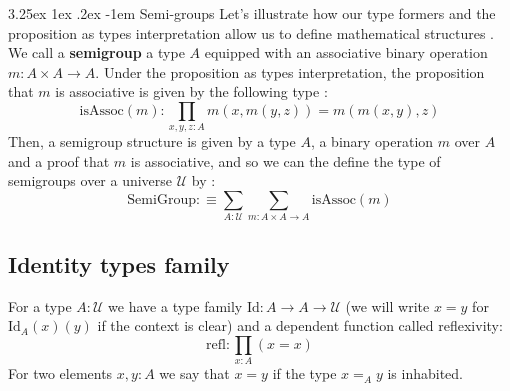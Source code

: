 \documentclass{report}
\makeatletter
\renewcommand\paragraph{\@startsection{paragraph}{5}{\z@}%
  {3.25ex \@plus1ex \@minus.2ex}%
  {-1em}%
  {\normalfont\normalsize\bfseries}}
\makeatother
\begin{document}
\paragraph{Semi-groups}
Let's illustrate how our type formers and the proposition as types interpretation allow us to define mathematical structures . We call a \textbf{semigroup} a type $A$ equipped with an associative binary operation $m : A \times A \rightarrow A$. Under the proposition as types interpretation, the proposition that $m$ is associative is given by the following type : 
$$\mathrm{isAssoc}(m) : \prod_{x,y,z : A }m(x,m(y,z))=m(m(x,y),z)$$
Then, a semigroup structure is given by a type $A$, a binary operation $m$ over $A$ and a proof that $m$ is associative, and so we can the define the type of semigroups over a universe $\mathcal{U}$ by : 
$$\mathrm{SemiGroup} :\equiv \sum_{A : \mathcal{U}} \sum_{m : A \times A \rightarrow A} \mathrm{isAssoc}(m)$$
\subsection{Identity types family}
For a type $A: \mathcal{U}$ we have a type family $\mathrm{Id} : A \rightarrow A \rightarrow \mathcal{U}$ (we will write $x=y$ for $\mathrm{Id}_A(x)(y)$ if the context is clear) and a dependent function called reflexivity:
$$\mathrm{refl} : \prod_{x : A} (x=x)$$
For two elements $x,y : A$ we say that $x=y$ if the type $x=_A y$ is inhabited.
\end{document}
